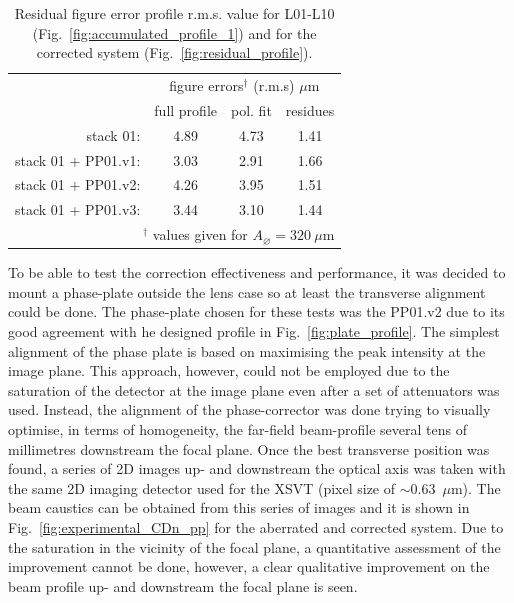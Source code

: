 \begin{refsection}
\begin{table}[t]
    \caption[Residual figure error profile value for L01-L10 and for the corrected system]{Residual figure error profile r.m.s. value for L01-L10 (Fig.~\ref{fig:accumulated_profile_1}) and for the corrected system (Fig.~\ref{fig:residual_profile}).}
    \centering
    \label{tab:corrected_xsvt}\small
    \begin{tabular}{rccc}
    \hline \hline
    &\multicolumn{3}{c}{figure errors$^\dagger$ (r.m.s) $\mu$m}\\ \cline{2-4}
    &full profile & pol. fit   & residues \\ \hline
    stack 01:           &4.89  &4.73  &1.41\\
    stack 01 + PP01.v1: &3.03  &2.91  &1.66\\
    stack 01 + PP01.v2: &4.26  &3.95  &1.51\\
    stack 01 + PP01.v3: &3.44  &3.10  &1.44\\
    \hline \hline
    \multicolumn{4}{r}{\footnotesize{$^\dagger$ values given for $A_{\diameter}=320~\mu\text{m}$}}     
    \end{tabular}
\end{table}

To be able to test the correction effectiveness and performance, it was decided to mount a phase-plate outside the lens case so at least the transverse alignment could be done. The phase-plate chosen for these tests was the PP01.v2 due to its good agreement with he designed profile in Fig.~\ref{fig:plate_profile}. The simplest alignment of the phase plate is based on maximising the peak intensity at the image plane. This approach, however, could not be employed due to the saturation of the detector at the image plane even after a set of attenuators was used. Instead, the alignment of the phase-corrector was done trying to visually optimise, in terms of homogeneity, the far-field beam-profile several tens of millimetres downstream the focal plane. Once the best transverse position was found, a series of 2D images up- and downstream the optical axis was taken with the same 2D imaging detector used for the XSVT (pixel size of $\sim$0.63~$\mu$m). The beam caustics can be obtained from this series of images and it is shown in Fig.~\ref{fig:experimental_CDn_pp} for the aberrated and corrected system. Due to the saturation in the vicinity of the focal plane, a quantitative assessment of the improvement cannot be done, however, a clear qualitative improvement on the beam profile up- and downstream the focal plane is seen.



\end{refsection}
